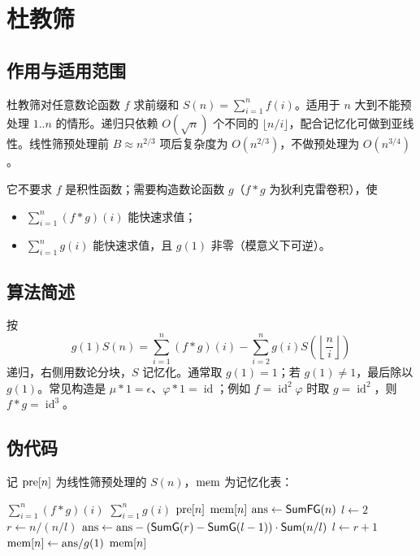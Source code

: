 \section{杜教筛}\label{sec:du-sieve}

\subsection{作用与适用范围}

杜教筛对任意数论函数 $f$ 求前缀和 $S(n)=\sum_{i=1}^{n}f(i)$。适用于 $n$ 大到不能预处理 $1..n$ 的情形。递归只依赖 $O(\sqrt n)$ 个不同的 $\lfloor n/i\rfloor$，配合记忆化可做到亚线性。线性筛预处理前 $B\approx n^{2/3}$ 项后复杂度为 $O(n^{2/3})$，不做预处理为 $O(n^{3/4})$。

它不要求 $f$ 是积性函数；需要构造数论函数 $g$（$f*g$ 为狄利克雷卷积），使
\begin{itemize}[leftmargin=1.8em, itemsep=0.15em, topsep=0.2em]
    \item $\sum_{i=1}^{n}(f*g)(i)$ 能快速求值；
    \item $\sum_{i=1}^{n}g(i)$ 能快速求值，且 $g(1)$ 非零（模意义下可逆）。
\end{itemize}

\subsection{算法简述}

按
$$
g(1)S(n)=\sum_{i=1}^{n}(f*g)(i)-\sum_{i=2}^{n}g(i)S\left(\left\lfloor\frac{n}{i}\right\rfloor\right)
$$
递归，右侧用数论分块，$S$ 记忆化。通常取 $g(1)=1$；若 $g(1)\ne1$，最后除以 $g(1)$。常见构造是 $\mu*1=\epsilon$、$\varphi*1=\operatorname{id}$；例如 $f=\operatorname{id}^2\varphi$ 时取 $g=\operatorname{id}^2$，则 $f*g=\operatorname{id}^3$。

\subsection{伪代码}

记 $\pvar{pre}[n]$ 为线性筛预处理的 $S(n)$，$\pvar{mem}$ 为记忆化表：

\begin{algorithm}[H]
    \caption{杜教筛}
    \begin{algorithmic}[1]
            \State \Return $\sum_{i=1}^{n}(f*g)(i)$
        \EndProcedure
            \State \Return $\sum_{i=1}^{n}g(i)$
        \EndProcedure
                \State \Return $\pvar{pre}[n]$
            \EndIf
                \State \Return $\pvar{mem}[n]$
            \EndIf
            \State $\pvar{ans} \gets \Call{SumFG}{n}$
            \State $l \gets 2$
                \State $r \gets n / (n / l)$
                \State $\pvar{ans} \gets \pvar{ans} - (\Call{SumG}{r}-\Call{SumG}{l-1})\cdot \Call{Sum}{n/l}$
                \State $l \gets r + 1$
            \EndWhile
            \State $\pvar{mem}[n] \gets \pvar{ans} / g(1)$
            \State \Return $\pvar{mem}[n]$
        \EndProcedure
    \end{algorithmic}
\end{algorithm}
